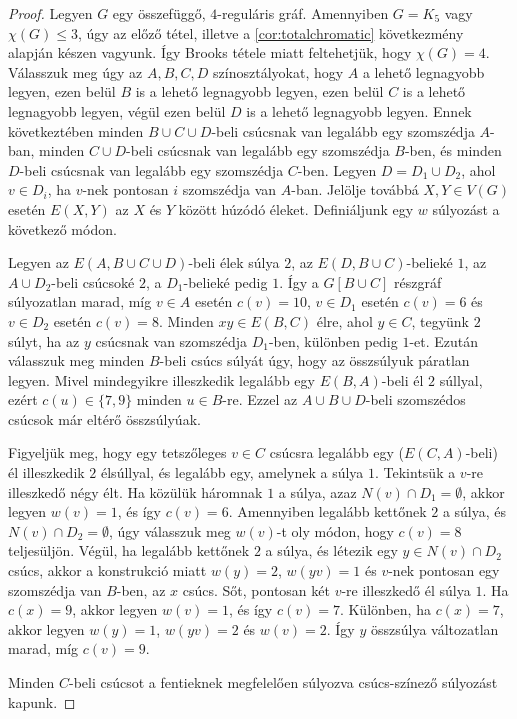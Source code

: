 \documentclass[12pt, a4paper]{report}
\theoremstyle{remark}
\theoremstyle{definition}
\begin{document}
\begin{proof}
Legyen $G$ egy összefüggő, $4$-reguláris gráf. Amennyiben $G = K_5$ vagy $\chi(G) \leq 3$, úgy az előző tétel, illetve a \ref{cor:totalchromatic} következmény alapján készen vagyunk. Így Brooks tétele miatt feltehetjük, hogy $\chi(G) = 4$. Válasszuk meg úgy az $A, B, C, D$ színosztályokat, hogy $A$ a lehető legnagyobb legyen, ezen belül $B$ is a lehető legnagyobb legyen, ezen belül $C$ is a lehető legnagyobb legyen, végül ezen belül $D$ is a lehető legnagyobb legyen. Ennek következtében minden $B \cup C \cup D$-beli csúcsnak van legalább egy szomszédja $A$-ban, minden $C \cup D$-beli csúcsnak van legalább egy szomszédja $B$-ben, és minden $D$-beli csúcsnak van legalább egy szomszédja $C$-ben. Legyen $D = D_1 \cup D_2$, ahol $v \in D_i$, ha $v$-nek pontosan $i$ szomszédja van $A$-ban. Jelölje továbbá $X, Y \in V(G)$ esetén $E(X, Y)$ az $X$ és $Y$ között húzódó éleket. Definiáljunk egy $w$ súlyozást a következő módon.

Legyen az $E(A, B \cup C \cup D)$-beli élek súlya $2$, az $E(D, B \cup C)$-belieké $1$, az $A \cup D_2$-beli csúcsoké $2$, a $D_1$-belieké pedig $1$. Így a $G[B \cup C]$ részgráf súlyozatlan marad, míg $v \in A$ esetén $c(v) = 10$, $v \in D_1$ esetén $c(v) = 6$ és $v \in D_2$ esetén $c(v) = 8$. Minden $xy \in E(B, C)$ élre, ahol $y \in C$, tegyünk $2$ súlyt, ha az $y$ csúcsnak van szomszédja $D_1$-ben, különben pedig $1$-et. Ezután válasszuk meg minden $B$-beli csúcs súlyát úgy, hogy az összsúlyuk páratlan legyen. Mivel mindegyikre illeszkedik legalább egy $E(B, A)$-beli él $2$ súllyal, ezért $c(u) \in \lbrace 7, 9 \rbrace$ minden $u \in B$-re. Ezzel az $A \cup B \cup D$-beli szomszédos csúcsok már eltérő összsúlyúak.

Figyeljük meg, hogy egy tetszőleges $v \in C$ csúcsra legalább egy ($E(C, A)$-beli) él illeszkedik $2$ élsúllyal, és legalább egy, amelynek a súlya $1$. Tekintsük a $v$-re illeszkedő négy élt. Ha közülük háromnak $1$ a súlya, azaz $N(v) \cap D_1 = \emptyset$, akkor legyen $w(v) = 1$, és így $c(v) = 6$. Amennyiben legalább kettőnek $2$ a súlya, és $N(v) \cap D_2 = \emptyset$, úgy válasszuk meg $w(v)$-t oly módon, hogy $c(v) = 8$ teljesüljön. Végül, ha legalább kettőnek $2$ a súlya, és létezik egy $y \in N(v) \cap D_2$ csúcs, akkor a konstrukció miatt $w(y) = 2$, $w(yv) = 1$ és $v$-nek pontosan egy szomszédja van $B$-ben, az $x$ csúcs. Sőt, pontosan két $v$-re illeszkedő él súlya $1$. Ha $c(x) = 9$, akkor legyen $w(v) = 1$, és így $c(v) = 7$. Különben, ha $c(x) = 7$, akkor legyen $w(y) = 1$, $w(yv) = 2$ és $w(v) = 2$. Így $y$ összsúlya változatlan marad, míg $c(v) = 9$.

Minden $C$-beli csúcsot a fentieknek megfelelően súlyozva csúcs-színező súlyozást kapunk.
\end{proof}
\end{document}
